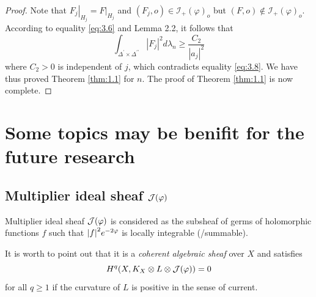 \begin{proof}
Note that $\left.F_j\right|_{H_j}=\left.F\right|_{H_j}$ and $\left(F_j, o\right) \in \mathcal{I}_{+}(\varphi)_o$ but $(F, o) \notin \mathcal{I}_{+}(\varphi)_o$. According to equality \eqref{eq:3.6} and Lemma 2.2, it follows that
$$
\int_{\Delta^{\prime} \times \Delta^{\prime \prime}}\left|F_j\right|^2 d \lambda_n \geq \frac{C_2}{\left|a_j\right|^2}
$$
where $C_2>0$ is independent of $j$, which contradicts equality \eqref{eq:3.8}.
We have thus proved Theorem \ref{thm:1.1} for $n$. The proof of Theorem \ref{thm:1.1} is now complete.


\end{proof}



\section{Some topics may be benifit for the future research}
\subsection{Multiplier ideal sheaf \texorpdfstring{${\mathcal J}(\varphi)$}{}}
\begin{definition}\label{defi:MIF}
    Multiplier ideal sheaf ${\mathcal J}(\varphi)$ is considered as the subsheaf of germs of holomorphic functions $f$  such that $\abs{f}^2 e^{-2\varphi}$ is locally integrable (/summable).

    It is worth to point out that it is a \emph{coherent algebraic sheaf} over $X$ and satisfies
    \[H^q(X,K_X\otimes L\otimes {\mathcal J}(\varphi))=0\]
    for all $q\geq 1$ if the curvature of $L$ is positive in the sense of current.
\end{definition}

